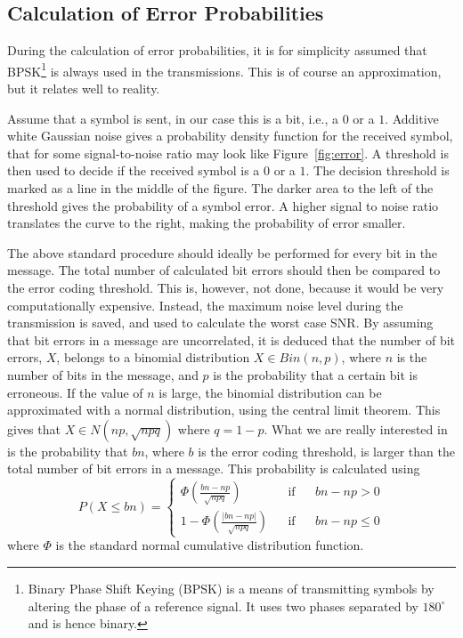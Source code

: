 \documentclass[final,twoside]{rapport}
\begin{document}
\subsection{Calculation of Error Probabilities}
During the calculation of error probabilities, it is for simplicity
assumed that
 BPSK\footnote{Binary Phase Shift Keying (BPSK) is a means of transmitting
   symbols by altering the phase of a reference signal. It uses two
   phases separated by $180^\circ$ and is hence binary.} is always used in the transmissions.
This is of course an approximation, but it relates well to reality.

Assume that a symbol is sent, in our case this is a bit, i.e., a $0$
or a $1$. Additive white Gaussian noise gives a probability density
function for the received symbol, that for some signal-to-noise ratio
may look like Figure~\ref{fig:error}. A threshold is then used to
decide if the received symbol is a $0$ or a $1$. The decision
threshold is marked as a line in the middle of the figure. The darker
area to the left of the threshold gives the probability of a symbol
error. A higher signal to noise ratio translates the curve to the
right, making
the probability of error smaller.

The above standard procedure should ideally be performed for every bit
in the message. The total number of calculated bit errors should then
be compared to the error coding threshold. This is, however, not done,
because it would be very computationally expensive. Instead, the
maximum noise level during the transmission is saved, and used to
calculate the worst case SNR. By assuming that bit errors in a message
are uncorrelated, it is deduced that the number of bit errors, $X$,
belongs to a binomial distribution $X\in Bin(n,p)$, where $n$ is the
number of bits in the message, and $p$ is the probability that a
certain bit is erroneous. If the value of $n$ is large, the binomial
distribution can be approximated with a normal distribution, using the
central limit theorem. This gives that $X\in N(np,\sqrt{npq})$ where
$q=1-p$. What we are really interested in is the probability that
$bn$, where $b$ is the error coding threshold, is larger than the
total number of bit errors in a message. This probability is
calculated using
\[
P(X\le bn)=
\left\{
\begin{aligned}
\Phi(\frac{bn-np}{\sqrt{npq}}) && \mathrm{if} && bn-np> 0\\
1-\Phi(\frac{\left|bn-np\right|}{\sqrt{npq}}) && \mathrm{if} && bn-np\le 0
\end{aligned}
\right.
\]
where $\Phi$ is the standard normal cumulative distribution function.
\end{document}
